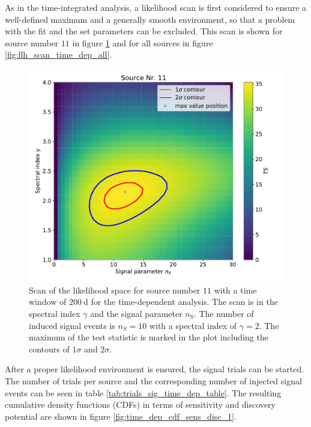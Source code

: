 As in the time-integrated analysis, a likelihood scan is first considered to ensure a well-defined maximum and a generally smooth environment, so that a problem with the fit and the set parameters can be excluded.
This scan is shown for source number $\num{11}$ in figure \ref{fig:llh_scan_time_dep} and for all sources in figure \ref{fig:llh_scan_time_dep_all}.
\begin{figure}
    \centering
    \includegraphics[width=\linewidth]{Plots/05_csky/llh_scan_1.pdf}
    \caption{Scan of the likelihood space for source number $\num{11}$ with a time window of $\SI{200}{\day}$ for the time-dependent analysis. The scan is in the spectral index $\gamma$ and the signal parameter $n_\text{S}$. The number of induced signal events is $n_S = \num{10}$ with a spectral index of $\gamma = 2$. The maximum of the test statistic is marked in the plot including the contours of $\num{1}\sigma$ and $\num{2}\sigma$.}
    \label{fig:llh_scan_time_dep}
\end{figure}
After a proper likelihood environment is ensured, the signal trials can be started.
The number of trials per source and the corresponding number of injected signal events can be seen in table \ref{tab:trials_sig_time_dep_table}.
The resulting cumulative density functions (CDFs) in terms of sensitivity and discovery potential are shown in figure \ref{fig:time_dep_cdf_sens_disc_1}.
